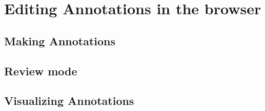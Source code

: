 \section{Editing Annotations in the browser}

\subsection{Making Annotations}

\subsection{Review mode}

\subsection{Visualizing Annotations}